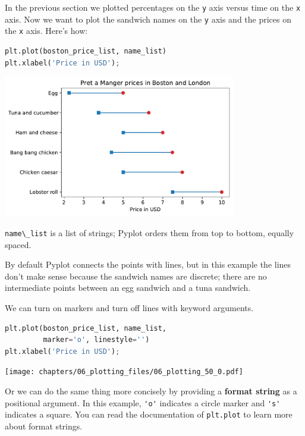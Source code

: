 In the previous section we plotted percentages on the
\passthrough{\lstinline!y!} axis versus time on the
\passthrough{\lstinline!x!} axis. Now we want to plot the sandwich names
on the \passthrough{\lstinline!y!} axis and the prices on the
\passthrough{\lstinline!x!} axis. Here's how:

\begin{lstlisting}[language=Python,style=source]
plt.plot(boston_price_list, name_list)
plt.xlabel('Price in USD');
\end{lstlisting}

\begin{center}
\includegraphics[width=4in]{chapters/06_plotting_files/06_plotting_48_0.pdf}
\end{center}

\passthrough{\lstinline!name\_list!} is a list of strings; Pyplot orders
them from top to bottom, equally spaced.

By default Pyplot connects the points with lines, but in this example
the lines don't make sense because the sandwich names are discrete;
there are no intermediate points between an egg sandwich and a tuna
sandwich.

We can turn on markers and turn off lines with keyword arguments.

\begin{lstlisting}[language=Python,style=source]
plt.plot(boston_price_list, name_list, 
         marker='o', linestyle='')
plt.xlabel('Price in USD');
\end{lstlisting}

\begin{center}
\texttt{[image: chapters/06\_plotting\_files/06\_plotting\_50\_0.pdf]}
\end{center}

Or we can do the same thing more concisely by providing a \textbf{format
string} as a positional argument. In this example,
\passthrough{\lstinline!'o'!} indicates a circle marker and
\passthrough{\lstinline!'s'!} indicates a square. You can read the
documentation of \passthrough{\lstinline!plt.plot!} to learn more about
format strings.

